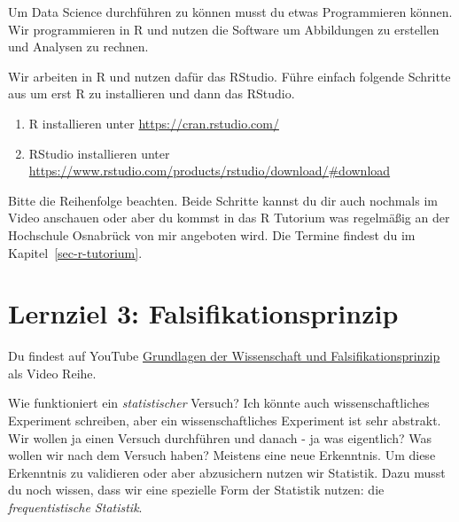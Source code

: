 \documentclass[
  letterpaper,
]{scrbook}
\providecommand{\tightlist}{%
  \setlength{\itemsep}{0pt}\setlength{\parskip}{0pt}}\usepackage{longtable,booktabs,array}
\begin{document}
Um Data Science durchführen zu können musst du etwas Programmieren
können. Wir programmieren in R und nutzen die Software um Abbildungen zu
erstellen und Analysen zu rechnen.

Wir arbeiten in R und nutzen dafür das RStudio. Führe einfach folgende
Schritte aus um erst R zu installieren und dann das RStudio.

\begin{enumerate}
\def\labelenumi{\arabic{enumi}.}
\tightlist
\item
  R installieren unter \url{https://cran.rstudio.com/}
\item
  RStudio installieren unter
  \url{https://www.rstudio.com/products/rstudio/download/\#download}
\end{enumerate}

Bitte die Reihenfolge beachten. Beide Schritte kannst du dir auch
nochmals im Video anschauen oder aber du kommst in das R Tutorium was
regelmäßig an der Hochschule Osnabrück von mir angeboten wird. Die
Termine findest du im Kapitel~\ref{sec-r-tutorium}.

\hypertarget{lernziel-3-falsifikationsprinzip}{%
\section{Lernziel 3:
Falsifikationsprinzip}\label{lernziel-3-falsifikationsprinzip}}

\begin{tcolorbox}[enhanced jigsaw, coltitle=black, titlerule=0mm, bottomrule=.15mm, opacityback=0, opacitybacktitle=0.6, leftrule=.75mm, title=\textcolor{quarto-callout-tip-color}{\faLightbulb}\hspace{0.5em}{Grundlagen der Wissenschaft und Falsifikationsprinzip}, toprule=.15mm, bottomtitle=1mm, toptitle=1mm, left=2mm, breakable, arc=.35mm, colback=white, rightrule=.15mm, colbacktitle=quarto-callout-tip-color!10!white, colframe=quarto-callout-tip-color-frame]
Du findest auf YouTube \href{https://youtu.be/h45ftLNsspM}{Grundlagen
der Wissenschaft und Falsifikationsprinzip} als Video Reihe.
\end{tcolorbox}

Wie funktioniert ein \emph{statistischer} Versuch? Ich könnte auch
wissenschaftliches Experiment schreiben, aber ein wissenschaftliches
Experiment ist sehr abstrakt. Wir wollen ja einen Versuch durchführen
und danach - ja was eigentlich? Was wollen wir nach dem Versuch haben?
Meistens eine neue Erkenntnis. Um diese Erkenntnis zu validieren oder
aber abzusichern nutzen wir Statistik. Dazu musst du noch wissen, dass
wir eine spezielle Form der Statistik nutzen: die \emph{frequentistische
Statistik}.
\end{document}
